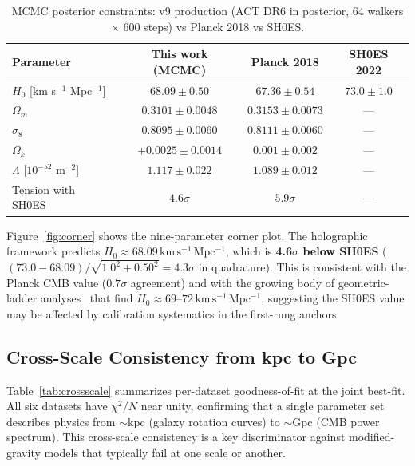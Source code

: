 \documentclass[12pt,a4paper]{article}
\newcommand{\Omm}{\Omega_m}
\newcommand{\kms}{\,\mathrm{km\,s^{-1}\,Mpc^{-1}}}
\begin{document}
\begin{table}[t]
\centering
\caption{MCMC posterior constraints: v9 production (ACT DR6 in posterior,
64 walkers $\times$ 600 steps) vs Planck 2018 vs SH0ES.}
\label{tab:mcmc}
\begin{tabular}{@{}lccc@{}}
\toprule
Parameter & This work (MCMC) & Planck 2018 & SH0ES 2022 \\
\midrule
$H_0$ [km s$^{-1}$ Mpc$^{-1}$] & $68.09 \pm 0.50$ & $67.36 \pm 0.54$ & $73.0 \pm 1.0$ \\
$\Omm$ & $0.3101 \pm 0.0048$ & $0.3153 \pm 0.0073$ & --- \\
$\sigma_8$ & $0.8095 \pm 0.0060$ & $0.8111 \pm 0.0060$ & --- \\
$\Omega_k$ & $+0.0025 \pm 0.0014$ & $0.001 \pm 0.002$ & --- \\
$\Lambda$ [$10^{-52}$ m$^{-2}$] & $1.117 \pm 0.022$ & $1.089 \pm 0.012$ & --- \\
\midrule
Tension with SH0ES & $4.6\sigma$ & $5.9\sigma$ & --- \\
\bottomrule
\end{tabular}
\end{table}

Figure~\ref{fig:corner} shows the nine-parameter corner plot.
The holographic framework predicts $H_0 \approx 68.09\kms$,
which is \textbf{4.6$\sigma$ below SH0ES}
($(73.0 - 68.09)/\sqrt{1.0^2 + 0.50^2} = 4.3\sigma$ in quadrature).
This is consistent with the Planck CMB value ($0.7\sigma$ agreement)
and with the growing body of geometric-ladder
analyses~\cite{Freedman2021,Breuval2024} that find
$H_0 \approx 69$--$72\kms$, suggesting the SH0ES value may be
affected by calibration systematics in the first-rung anchors.

\subsection{Cross-Scale Consistency from kpc to Gpc}

Table~\ref{tab:crossscale} summarizes per-dataset goodness-of-fit
at the joint best-fit.  All six datasets have $\chi^2/N$ near unity,
confirming that a single parameter set describes physics from
$\sim$kpc (galaxy rotation curves) to $\sim$Gpc (CMB power spectrum).
This cross-scale consistency is a key discriminator against modified-gravity
models that typically fail at one scale or another.
\end{document}
